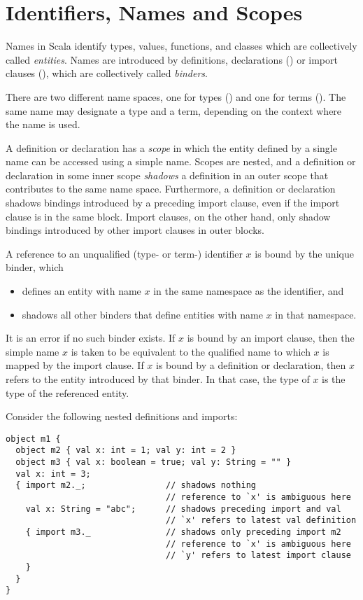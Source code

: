 \documentclass[a4paper,12pt,twoside,titlepage]{book}
\begin{document}
\chapter{\label{sec:names}Identifiers, Names and Scopes}

Names in Scala identify types, values, functions, and classes which
are collectively called {\em entities}.  Names are introduced by
definitions, declarations () or import clauses
(), which are collectively called {\em binders}.

There are two different name spaces, one for types ()
and one for terms ().  The same name may designate a
type and a term, depending on the context where the name is used.  

A definition or declaration has a {\em scope} in which the entity
defined by a single name can be accessed using a simple name. Scopes
are nested, and a definition or declaration in some inner scope {\em
shadows} a definition in an outer scope that contributes to the same
name space. Furthermore, a definition or declaration shadows bindings
introduced by a preceding import clause, even if the import clause is
in the same block. Import clauses, on the other hand, only shadow
bindings introduced by other import clauses in outer blocks.

A reference to an unqualified (type- or term-) identifier $x$ is bound
by the unique binder, which
\begin{itemize}
\item defines an entity with name $x$ in the same namespace as the
identifier, and
\item shadows all other binders that define entities with name $x$ in that namespace.
\end{itemize}
It is an error if no such binder exists.  If $x$ is bound by an import
clause, then the simple name $x$ is taken to be equivalent to the
qualified name to which $x$ is mapped by the import clause. If $x$ is bound by a definition or declaration,
then $x$ refers to the entity introduced by that
binder. In that case, the type of $x$ is the type of the referenced
entity.

\example Consider the following nested definitions and imports:

\begin{lstlisting}
object m1 {
  object m2 { val x: int = 1; val y: int = 2 }
  object m3 { val x: boolean = true; val y: String = "" }
  val x: int = 3;              
  { import m2._;                // shadows nothing
                                // reference to `x' is ambiguous here
    val x: String = "abc";      // shadows preceding import and val
                                // `x' refers to latest val definition
    { import m3._               // shadows only preceding import m2
                                // reference to `x' is ambiguous here
                                // `y' refers to latest import clause
    }
  }
} 
\end{lstlisting}
\end{document}
